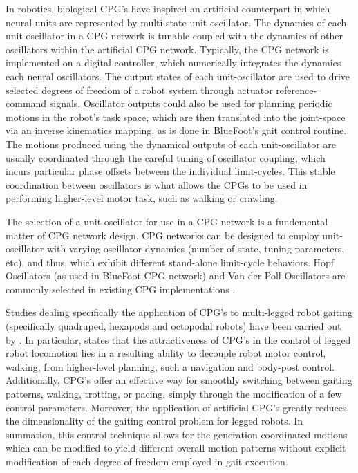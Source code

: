 		In robotics, biological CPG's have inspired an artificial counterpart in which neural units are represented by multi-state unit-oscillator. The dynamics of each unit oscillator in a CPG network is tunable coupled with the dynamics of other oscillators within the artificial CPG network. Typically, the CPG network is implemented on a digital controller, which numerically integrates the dynamics each neural oscillators. The output states of each unit-oscillator are used to drive selected degrees of freedom of a robot system through actuator reference-command signals. Oscillator outputs could also be used for planning periodic motions in the robot's task space, which are then translated into the joint-space via an inverse kinematics mapping, as is done in BlueFoot's gait control routine. The motions produced using the dynamical outputs of each unit-oscillator are usually coordinated through the careful tuning of oscillator coupling, which incurs particular phase offsets between the individual limit-cycles. This stable coordination between oscillators is what allows the CPGs to be used in performing higher-level motor task, such as walking or crawling.

		The selection of a unit-oscillator for use in a CPG network is a fundemental matter of CPG network design. CPG networks can be designed to employ unit-oscillator with varying oscillator dynamics (\IE number of state, tuning parameters, etc), and thus, which exhibit different stand-alone limit-cycle behaviors. Hopf Oscillators (as used in BlueFoot CPG network) and Van der Poll Oscillators are commonly selected in existing CPG implementations \cite{needRefsHere}.

		Studies dealing specifically the application of CPG's to multi-legged robot gaiting (specifically quadruped, hexapods and octopodal robots) have been carried out by \cite{Arena2001,Klaassen2002,Arena2004,Inagaki2003,Inagaki2006,Billard2000,Brambilla2006,Buchli2006,Tsujita2001,Tsujita2004}.  In particular, \cite{Ijspeert2008} states that the attractiveness of CPG's in the control of legged robot locomotion lies in a resulting ability to decouple robot motor control, \IE walking, from higher-level planning, such a navigation and body-post control. Additionally, CPG's offer an effective way for smoothly switching between gaiting patterns, \EG walking, trotting, or pacing, simply through the modification of a few control parameters. Moreover, the application of artificial CPG's greatly reduces the dimensionality of the gaiting control problem for legged robots. In summation, this control technique allows for the generation coordinated motions which can be modified to yield different overall motion patterns without explicit modification of each degree of freedom employed in gait execution.

